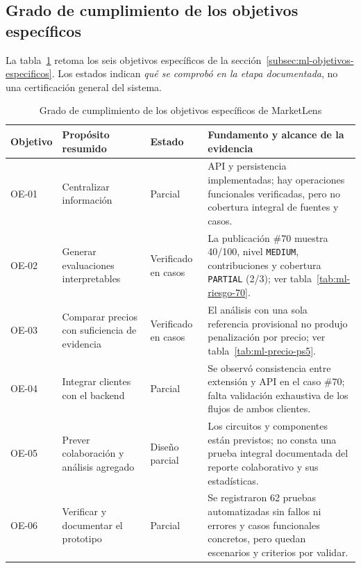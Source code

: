 \subsection{Grado de cumplimiento de los objetivos específicos}\label{subsec:ml-cumplimiento-objetivos}

La tabla~\ref{tab:ml-cumplimiento-objetivos} retoma los seis objetivos específicos de la sección~\ref{subsec:ml-objetivos-especificos}. Los estados indican \textit{qué se comprobó en la etapa documentada}, no una certificación general del sistema.

\begin{table}[htbp]
    \centering
    \caption{Grado de cumplimiento de los objetivos específicos de MarketLens}
    \label{tab:ml-cumplimiento-objetivos}
    \scriptsize
    \begin{tabularx}{\textwidth}{@{}p{1.3cm} p{2.25cm} p{1.8cm} X@{}}
        \toprule
        \textbf{Objetivo} & \textbf{Propósito resumido} & \textbf{Estado} & \textbf{Fundamento y alcance de la evidencia} \\
        \midrule
        OE-01 & Centralizar información & Parcial & API y persistencia implementadas; hay operaciones funcionales verificadas, pero no cobertura integral de fuentes y casos. \\
        OE-02 & Generar evaluaciones interpretables & Verificado en casos & La publicación \#70 muestra 40/100, nivel \texttt{MEDIUM}, contribuciones y cobertura \texttt{PARTIAL} (2/3); ver tabla~\ref{tab:ml-riesgo-70}. \\
        OE-03 & Comparar precios con suficiencia de evidencia & Verificado en casos & El análisis con una sola referencia provisional no produjo penalización por precio; ver tabla~\ref{tab:ml-precio-ps5}. \\
        OE-04 & Integrar clientes con el backend & Parcial & Se observó consistencia entre extensión y API en el caso \#70; falta validación exhaustiva de los flujos de ambos clientes. \\
        OE-05 & Prever colaboración y análisis agregado & Diseño parcial & Los circuitos y componentes están previstos; no consta una prueba integral documentada del reporte colaborativo y sus estadísticas. \\
        OE-06 & Verificar y documentar el prototipo & Parcial & Se registraron 62 pruebas automatizadas sin fallos ni errores y casos funcionales concretos, pero quedan escenarios y criterios por validar. \\
        \bottomrule
    \end{tabularx}
\end{table}

